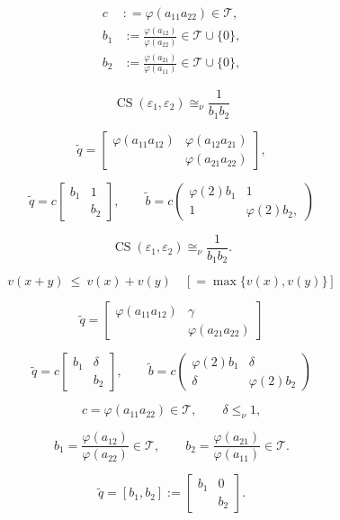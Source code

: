 \documentclass{article}
\begin{document}
\begin{align*}c&: = {\varphi}(a_{11}a_{22})\in{\mathcal T},\\
 b_1&:=\frac{{\varphi}(a_{12})}{{\varphi}(a_{22})}\in{\mathcal T}\cup\{0\},\\
 b_2&:=\frac{{\varphi}(a_{21})}{{\varphi}(a_{11})}\in{\mathcal T}\cup\{0\},\end{align*}

$${\operatorname{CS}}({\varepsilon}_1,{\varepsilon}_2)\cong_\nu\frac{1}{b_1b_2}$$

$${\tilde q}=\begin{bmatrix} {\varphi}(a_{11}a_{12}) & {\varphi}(a_{12}a_{21})\\
  & {\varphi}(a_{21}a_{22})\end{bmatrix},$$

$${\tilde q}=c\begin{bmatrix} b_1 & 1\\  & b_2\end{bmatrix},\qquad{\tilde b}=c\begin{pmatrix} {\varphi}(2)b_1 & 1\\ 1 & {\varphi}(2)b_2,\end{pmatrix}$$

$${\operatorname{CS}}({\varepsilon}_1,{\varepsilon}_2)\cong_\nu \frac{1}{b_1b_2}.$$

$$ v(x+y) {\ {\leq} \ } v(x) + v(y) \quad [= \max\{ v(x), v(y)\}]$$

$${\tilde q}=\begin{bmatrix} {\varphi}(a_{11}a_{12}) & \gamma\\  & {\varphi}(a_{21}a_{22})\end{bmatrix}$$

$${\tilde q}=c\begin{bmatrix} b_1 &\delta\\  & b_2\end{bmatrix},\qquad {\tilde b}=c\begin{pmatrix} {\varphi}(2)b_1 & \delta\\
\delta & {\varphi}(2)b_2\end{pmatrix}$$

$$c={\varphi}(a_{11}a_{22})\in{\mathcal T},\qquad \delta\le_\nu1,$$

$$b_1=\frac{{\varphi}(a_{12})}{{\varphi}(a_{22})}\in{\mathcal T},\qquad b_2=\frac{{\varphi}(a_{21})}{{\varphi}(a_{11})}\in{\mathcal T}.$$

$${\tilde q}=[b_1,b_2]:=\begin{bmatrix} b_1 &0\\  & b_2\end{bmatrix}.$$
\end{document}
